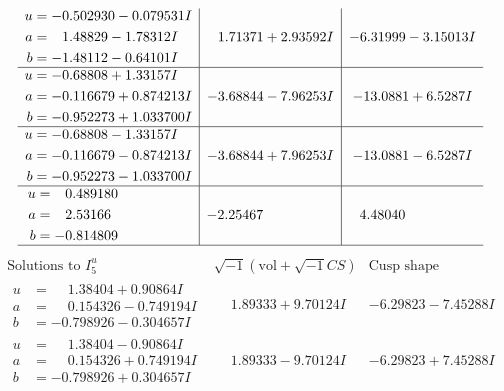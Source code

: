 \documentclass[1p]{elsarticle_modified}
\theoremstyle{definition}
\newcommand{\I}{\sqrt{-1}}
\begin{document}
$$\begin{array}{c|c|c}
\begin{aligned}
u &= -0.502930 - 0.079531 I \\
a &= \phantom{-}1.48829 - 1.78312 I \\
b &= -1.48112 - 0.64101 I\end{aligned}
 & \phantom{-}1.71371 + 2.93592 I & -6.31999 - 3.15013 I \\ \hline\begin{aligned}
u &= -0.68808 + 1.33157 I \\
a &= -0.116679 + 0.874213 I \\
b &= -0.952273 + 1.033700 I\end{aligned}
 & -3.68844 - 7.96253 I & -13.0881 + 6.5287 I \\ \hline\begin{aligned}
u &= -0.68808 - 1.33157 I \\
a &= -0.116679 - 0.874213 I \\
b &= -0.952273 - 1.033700 I\end{aligned}
 & -3.68844 + 7.96253 I & -13.0881 - 6.5287 I \\ \hline\begin{aligned}
u &= \phantom{-}0.489180\phantom{ +0.000000I} \\
a &= \phantom{-}2.53166\phantom{ +0.000000I} \\
b &= -0.814809\phantom{ +0.000000I}\end{aligned}
 & -2.25467\phantom{ +0.000000I} & \phantom{-}4.48040\phantom{ +0.000000I}\\
 \hline 
 \end{array}$$\newpage$$\begin{array}{c|c|c}  
\text{Solutions to }I^u_{5}& \I (\text{vol} + \sqrt{-1}CS) & \text{Cusp shape}\\
 \hline 
\begin{aligned}
u &= \phantom{-}1.38404 + 0.90864 I \\
a &= \phantom{-}0.154326 - 0.749194 I \\
b &= -0.798926 - 0.304657 I\end{aligned}
 & \phantom{-}1.89333 + 9.70124 I & -6.29823 - 7.45288 I \\ \hline\begin{aligned}
u &= \phantom{-}1.38404 - 0.90864 I \\
a &= \phantom{-}0.154326 + 0.749194 I \\
b &= -0.798926 + 0.304657 I\end{aligned}
 & \phantom{-}1.89333 - 9.70124 I & -6.29823 + 7.45288 I \\ \hline\begin{aligned}

\end{aligned}
\end{array}$$
\end{document}
